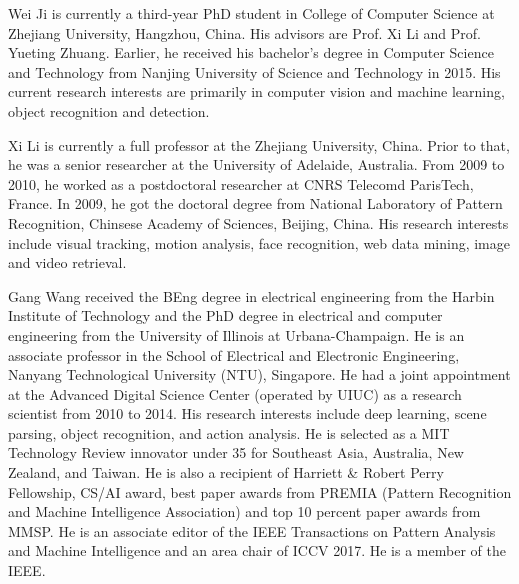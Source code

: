 \documentclass[journal,comsoc]{IEEEtran}
\begin{document}
\begin{IEEEbiography}{Wei Ji}
is currently a third-year PhD student in College of Computer Science at Zhejiang University, Hangzhou, China. His advisors are Prof. Xi Li and Prof. Yueting Zhuang. Earlier, he received his bachelor's degree in Computer Science and Technology from Nanjing University of Science and Technology in 2015. His current research interests are primarily in computer vision and machine learning, object recognition and detection.
\end{IEEEbiography}

\begin{IEEEbiography}{Xi Li}
is currently a full professor at the Zhejiang University, China. Prior to that, he was a senior researcher at the University of Adelaide, Australia. From 2009 to 2010, he worked as a postdoctoral researcher at CNRS Telecomd ParisTech, France. In 2009, he got the doctoral degree from National Laboratory of Pattern Recognition, Chinsese Academy of Sciences, Beijing, China. His research interests include visual tracking, motion analysis, face recognition, web data mining, image and video retrieval.
\end{IEEEbiography}

\begin{IEEEbiography}{Gang Wang} received the BEng degree in electrical engineering from the Harbin Institute of Technology and the PhD degree in electrical and computer engineering from the University of Illinois at Urbana-Champaign. He is an associate professor in the School of Electrical and Electronic Engineering, Nanyang Technological University (NTU), Singapore. He had a joint appointment at the Advanced Digital Science Center (operated by UIUC) as a research scientist from 2010 to 2014. His research interests include deep learning, scene parsing, object recognition, and action analysis. He is selected as a MIT Technology Review innovator under 35 for Southeast Asia, Australia, New Zealand, and Taiwan. He is also a recipient of Harriett \& Robert Perry Fellowship, CS/AI award, best paper awards from PREMIA (Pattern Recognition and Machine Intelligence Association) and top 10 percent paper awards from MMSP. He is an associate editor of the IEEE Transactions on Pattern Analysis and Machine Intelligence and an area chair of ICCV 2017. He is a member of the IEEE.
\end{IEEEbiography}
\end{document}

